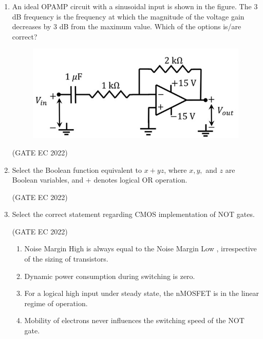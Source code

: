 \documentclass[journal,12pt,onecolumn]{IEEEtran}
\theoremstyle{remark}
\begin{document}
\begin{enumerate}
    \item An ideal OPAMP circuit with a sinusoidal input is shown in the figure. The 3 dB frequency is the frequency at which the magnitude of the voltage gain decreases by 3 dB from the maximum value. Which of the options is/are correct?
    \begin{figure}[H]
        \centering
        \includegraphics[width=0.5\columnwidth]{figs/m13.jpg}
        \caption*{}
        \label{fig:m13}
    \end{figure}

    \hfill{(GATE EC 2022)}
    \begin{enumerate}
    \end{enumerate}

    \item Select the Boolean function equivalent to $x+yz$, where $x, y,$ and $z$ are Boolean variables, and + denotes logical OR operation.

    \hfill{(GATE EC 2022)}
    \begin{enumerate}
    \end{enumerate}

    \item Select the correct statement regarding CMOS implementation of NOT gates.

    \hfill{(GATE EC 2022)}
    \begin{enumerate}
        \item Noise Margin High  is always equal to the Noise Margin Low , irrespective of the sizing of transistors.
        \item Dynamic power consumption during switching is zero.
        \item For a logical high input under steady state, the nMOSFET is in the linear regime of operation.
        \item Mobility of electrons never influences the switching speed of the NOT gate.
    \end{enumerate}


\end{enumerate}
\end{document}

